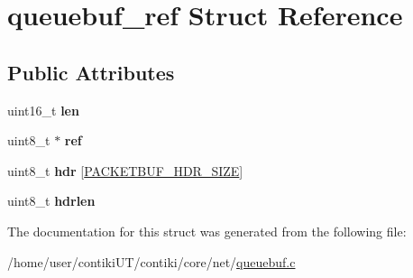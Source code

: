 \hypertarget{structqueuebuf__ref}{}\section{queuebuf\+\_\+ref Struct Reference}
\label{structqueuebuf__ref}
\subsection*{Public Attributes}
\begin{DoxyCompactItemize}
\item 
\hypertarget{structqueuebuf__ref_a47b93b46bef9176128894dc4d8c18023}{}uint16\+\_\+t {\bfseries len}\label{structqueuebuf__ref_a47b93b46bef9176128894dc4d8c18023}

\item 
\hypertarget{structqueuebuf__ref_a2577212273c986ab403e7782cc0b979a}{}uint8\+\_\+t $\ast$ {\bfseries ref}\label{structqueuebuf__ref_a2577212273c986ab403e7782cc0b979a}

\item 
\hypertarget{structqueuebuf__ref_a032633f75b70d0692a78a56186d564e8}{}uint8\+\_\+t {\bfseries hdr} \mbox{[}\hyperlink{group__packetbuf_gaf99c845894c567c1222a56be9c6cfe5b}{P\+A\+C\+K\+E\+T\+B\+U\+F\+\_\+\+H\+D\+R\+\_\+\+S\+I\+Z\+E}\mbox{]}\label{structqueuebuf__ref_a032633f75b70d0692a78a56186d564e8}

\item 
\hypertarget{structqueuebuf__ref_ae409e35d2daeb8c676606223dedeff0c}{}uint8\+\_\+t {\bfseries hdrlen}\label{structqueuebuf__ref_ae409e35d2daeb8c676606223dedeff0c}

\end{DoxyCompactItemize}


The documentation for this struct was generated from the following file\+:\begin{DoxyCompactItemize}
\item 
/home/user/contiki\+U\+T/contiki/core/net/\hyperlink{queuebuf_8c}{queuebuf.\+c}\end{DoxyCompactItemize}
